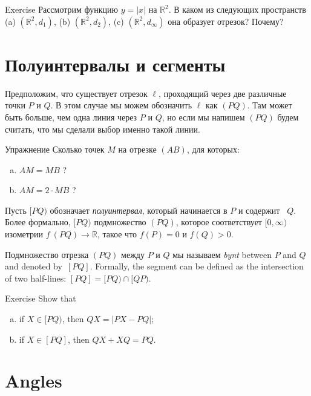 \begin{thm}{Exercise}\label{ex:y=|x|}
Рассмотрим функцию $y=|x|$ на $\mathbb{R}^2$.
В каком из следующих пространств 
(a) $(\mathbb{R}^2,d_1)$, 
(b) $(\mathbb{R}^2,d_2)$, 
(c) $(\mathbb{R}^2,d_\infty)$ 
она образует отрезок? 
Почему?
\end{thm}

\section*{Полуинтервалы и сегменты}

Предположим, что существует отрезок $\ell$, 
проходящий через две различные точки $P$ и $Q$.
В этом случае мы можем обозначить $\ell$ как $(PQ)$.
Там может быть больше, чем одна линия через $P$ и $Q$,
но если мы напишем \index{60@$(PQ)$, $[PQ)$, $[PQ]$}$(PQ)$ будем считать, что мы сделали выбор именно такой линии. 

\begin{thm}{Упражнение}\label{ex:2mid}
Сколько точек $M$ на отрезке $(A B)$, для которых:
\begin{enumerate}[(a)]
\item $AM= MB$ ?
\item $AM= 2\cdot MB$ ?
\end{enumerate}
\end{thm}

Пусть $[P Q)$ обозначает \emph{полуинтервал},
который начинается в $P$ и содержит ~$Q$. 
Более формально, $[P Q)$ подмножество $(P Q)$, которое соответствует $[0,\infty)$ изометрии $f\:(P Q)\to \mathbb{R}$, такое что $f(P)=0$ и $f(Q)>0$.

Подмножество отрезка $(P Q)$ между $P$ и $Q$ мы называем \emph{bynt} between $P$ and $Q$ and denoted by~$[P Q]$.
Formally, the segment can be defined as the intersection of two half-lines: $[P Q]=[P Q)\cap[Q P)$.

\begin{thm}{Exercise}\label{ex:trig==}
Show that 
\begin{enumerate}[(a)]
\item if $X\in [PQ)$, then 
$QX=|PX-PQ|$;
\item if $X\in [PQ]$, then 
$QX+XQ=PQ$.
\end{enumerate}

\end{thm}


\section*{Angles}

